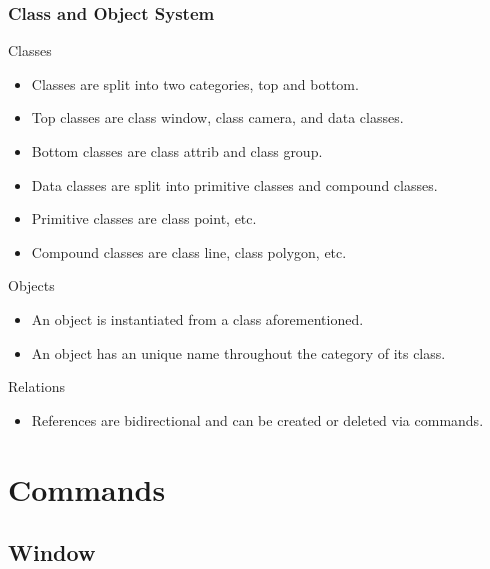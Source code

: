 \documentclass[10pt]{beamer}
\begin{document}
\begin{frame}[t] \frametitle{Class and Object System}

	\begin{block}{Classes}
		\begin{itemize}
			\item Classes are split into two categories, top and bottom.
			\item Top classes are class window, class camera, and data classes.
			\item Bottom classes are class attrib and class group.
			\item Data classes are split into primitive classes and compound classes.
			\item Primitive classes are class point, etc.
			\item Compound classes are class line, class polygon, etc.
		\end{itemize}
	\end{block}

	\begin{block}{Objects}
		\begin{itemize}
			\item An object is instantiated from a class aforementioned.
			\item An object has an unique name throughout the category of its class.
		\end{itemize}
	\end{block}

	\begin{block}{Relations}
		\begin{itemize}
			\item References are bidirectional and can be created or deleted via commands.
		\end{itemize}
	\end{block}

\end{frame}


\section{Commands}

\subsection{Window}
\end{document}
